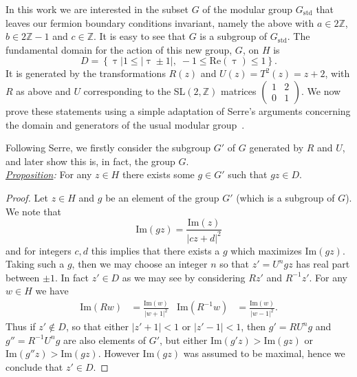 In this work we are interested in the subset $G$ of the modular group $G_{\text{std}}$ that leaves our fermion boundary conditions invariant, namely the above with $a \in 2 \mathbb{Z}$, $b \in 2 \mathbb{Z} - 1$ and $c \in \mathbb{Z}$.
It is easy to see that $G$ is a subgroup of $G_{\text{std}}$.
The fundamental domain for the action of this new group, $G$, on $H$ is
\begin{equation}
  D = \left\{\uptau\big|1 \le |\uptau \pm 1|, \; -1 \le \mathrm{Re}(\uptau) \le 1\right\}.
\end{equation}
It is generated by the transformations $R(z)$ and $U(z) = T^2(z) = z + 2$, with $R$ as above and $U$ corresponding to the SL$(2, \mathbb{Z})$ matrices $\left(\begin{array}{cc} 1 & 2 \\ 0 & 1 \end{array}\right)$.
We now prove these statements using a simple adaptation of Serre's arguments concerning the domain and generators of the usual modular group~\cite{Serre}.

Following Serre, we firstly consider the subgroup $G'$ of $G$ generated by $R$ and $U$, and later show this is, in fact, the group $G$. \\

\noindent \textit{\underline{Proposition}:} For any $z \in H$ there exists some $g \in G'$ such that $g z \in D$.

\begin{proof}
  Let $z \in H$ and $g$ be an element of the group $G'$ (which is a subgroup of $G$).
  We note that
  \begin{equation}
    \mathrm{Im}(g z) = \frac{\mathrm{Im}(z)}{|c z + d|^2}
  \end{equation}
  and for integers $c, d$ this implies that there exists a $g$ which maximizes $\mathrm{Im}(g z)$.
  Taking such a $g$, then we may choose an integer $n$ so that $z' = U^n g z$ has real part between $\pm 1$.
  In fact $z' \in D$ as we may see by considering $R z'$ and $R^{-1} z'$.
  For any $w \in H$ we have
  \begin{align}
    \mathrm{Im}(R w) & = \frac{\mathrm{Im}(w)}{|w + 1|^2} &
    \mathrm{Im}(R^{-1} w) & = \frac{\mathrm{Im}(w)}{|w - 1|^2}.
  \end{align}
  Thus if $z' \not\in D$, so that either $|z' + 1| < 1$ or $|z' - 1| < 1$, then $g' = R U^n g$ and $g'' = R^{-1} U^n g$ are also elements of $G'$, but either $\mathrm{Im}(g' z) > \mathrm{Im}(g z)$ or $\mathrm{Im}(g'' z) > \mathrm{Im}(g z)$.
  However $\mathrm{Im}(g z)$ was assumed to be maximal, hence we conclude that $z' \in D$.
\end{proof}

